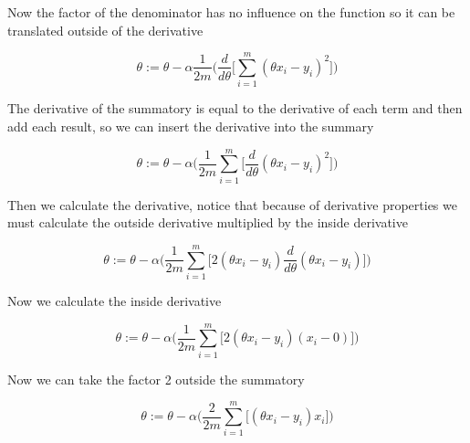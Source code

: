 \documentclass[12pt,journal]{IEEEtran}
\begin{document}
    Now the factor of the denominator has no influence on the function so it
    can be translated outside of the derivative

    \begin{equation}
        \theta := \theta - \alpha \frac{1}{2m}
            \Bigg(
                \frac{d}{d \theta}
                    \Bigg[
                        \sum_{i=1}^{m} (\theta x_i - y_i)^2
                    \Bigg]
            \Bigg)
    \end{equation}

    The derivative of the summatory is equal to the derivative of each term and
    then add each result, so we can insert the derivative into the summary

    \begin{equation}
        \theta := \theta - \alpha
            \Bigg(
                \frac{1}{2m} \sum_{i=1}^{m}
                    \Bigg[
                        \frac{d}{d \theta} (\theta x_i - y_i)^2
                    \Bigg]
            \Bigg)
    \end{equation}

    Then we calculate the derivative, notice that because of derivative
    properties we must calculate the outside derivative multiplied by the inside
    derivative

    \begin{equation}
        \theta := \theta - \alpha
            \Bigg(
                \frac{1}{2m} \sum_{i=1}^{m}
                    \Bigg[
                        2(\theta x_i - y_i) \frac{d}{d \theta}(\theta x_i - y_i)
                    \Bigg]
            \Bigg)
    \end{equation}

    Now we calculate the inside derivative

    \begin{equation}
        \theta := \theta - \alpha
            \Bigg(
                \frac{1}{2m} \sum_{i=1}^{m}
                    \Big[
                        2 (\theta x_i - y_i) (x_i - 0)
                    \Big]
            \Bigg)
    \end{equation}

    Now we can take the factor 2 outside the summatory

    \begin{equation}
        \theta := \theta - \alpha
            \Bigg(
                \frac{2}{2m} \sum_{i=1}^{m}
                    \Big[
                        (\theta x_i - y_i) x_i
                    \Big]
            \Bigg)
    \end{equation}
\end{document}
